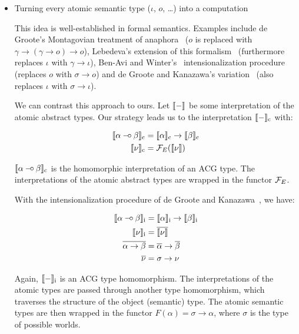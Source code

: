 \begin{itemize}
\item Turning every atomic semantic type ($\iota$, $o$, \ldots) into a
  computation

  This idea is well-established in formal semantics. Examples include de
  Groote's Montagovian treatment of anaphora~\cite{de2006towards} ($o$ is
  replaced with $\gamma \to (\gamma \to o) \to o$), Lebedeva's extension of
  this formalism~\cite{lebedeva2012expression} (furthermore replaces
  $\iota$ with $\gamma \to \iota$), Ben-Avi and
  Winter's~\cite{ben2007semantics} intensionalization procedure (replaces
  $o$ with $\sigma \to o$) and de Groote and Kanazawa's
  variation~\cite{de2013note} (also replaces $\iota$ with
  $\sigma \to \iota$).
  
  We can contrast this approach to ours. Let $\llbracket - \rrbracket$ be some
  interpretation of the atomic abstract types. Our strategy leads us to the
  interpretation $\llbracket - \rrbracket_{\mathrm{c}}$ with:
  
  \begin{align*}
    \llbracket \alpha \mathbin{{-}\mkern-3.5mu{\circ}} \beta \rrbracket_{\mathrm{c}} &= \llbracket \alpha \rrbracket_{\mathrm{c}} \to \llbracket \beta \rrbracket_{\mathrm{c}} \\
    \llbracket \nu \rrbracket_{\mathrm{c}} &= \mathcal{F}_E(\llbracket \nu \rrbracket)
  \end{align*}
  
  $\llbracket \alpha \mathbin{{-}\mkern-3.5mu{\circ}} \beta \rrbracket_{\mathrm{c}}$ is the homomorphic interpretation of
  an ACG type. The interpretations of the atomic abstract types are wrapped
  in the functor $\mathcal{F}_E$.

  With the intensionalization procedure of de Groote and
  Kanazawa~\cite{de2013note}, we have:

  \begin{align*}
    \llbracket \alpha \mathbin{{-}\mkern-3.5mu{\circ}} \beta \rrbracket_{\mathrm{i}} &= \llbracket \alpha \rrbracket_{\mathrm{i}} \to \llbracket \beta \rrbracket_{\mathrm{i}} \\
    \llbracket \nu \rrbracket_{\mathrm{i}} &= \overline{\llbracket \nu \rrbracket} \\
    \overline{\alpha \to \beta} &= \overline{\alpha} \to \overline{\beta} \\
    \overline{\nu} &= \sigma \to \nu
  \end{align*}
  
  Again, $\llbracket - \rrbracket_{\mathrm{i}}$ is an ACG type homomorphism. The interpretations
  of the atomic types are passed through another type homomorphism, which
  traverses the structure of the object (semantic) type. The atomic
  semantic types are then wrapped in the functor
  $F(\alpha) = \sigma \to \alpha$, where $\sigma$ is the type of possible
  worlds.


\end{itemize}
